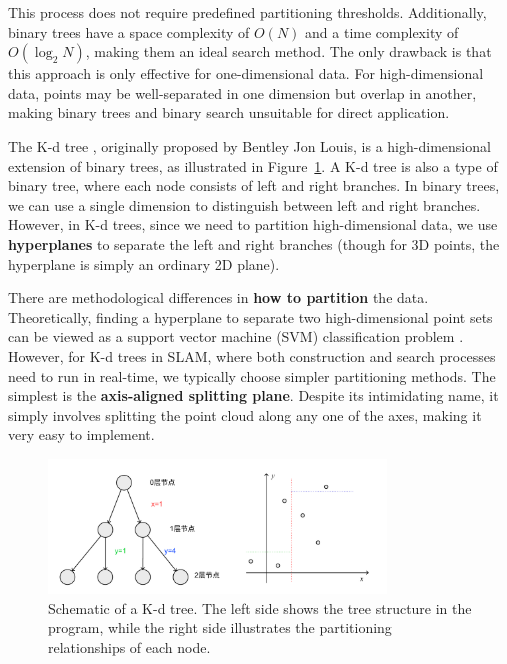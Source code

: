 This process does not require predefined partitioning thresholds. Additionally, binary trees have a space complexity of \(O(N)\) and a time complexity of \(O(\log_2 N)\), making them an ideal search method. The only drawback is that this approach is only effective for one-dimensional data. For high-dimensional data, points may be well-separated in one dimension but overlap in another, making binary trees and binary search unsuitable for direct application.  

The K-d tree \cite{Bentley1975}, originally proposed by Bentley Jon Louis, is a high-dimensional extension of binary trees, as illustrated in Figure~\ref{fig:kdtree}. A K-d tree is also a type of binary tree, where each node consists of left and right branches. In binary trees, we can use a single dimension to distinguish between left and right branches. However, in K-d trees, since we need to partition high-dimensional data, we use \textbf{hyperplanes} to separate the left and right branches (though for 3D points, the hyperplane is simply an ordinary 2D plane).  

There are methodological differences in \textbf{how to partition} the data. Theoretically, finding a hyperplane to separate two high-dimensional point sets can be viewed as a support vector machine (SVM) classification problem \cite{Cortes1995}. However, for K-d trees in SLAM, where both construction and search processes need to run in real-time, we typically choose simpler partitioning methods. The simplest is the \textbf{axis-aligned splitting plane}. Despite its intimidating name, it simply involves splitting the point cloud along any one of the axes, making it very easy to implement.  

\begin{figure}[!htp]
	\centering
	\includegraphics[width=0.8\textwidth]{resources/basic-point-cloud/kdtree.pdf}
	\caption{Schematic of a K-d tree. The left side shows the tree structure in the program, while the right side illustrates the partitioning relationships of each node.}
	\label{fig:kdtree}
\end{figure}

